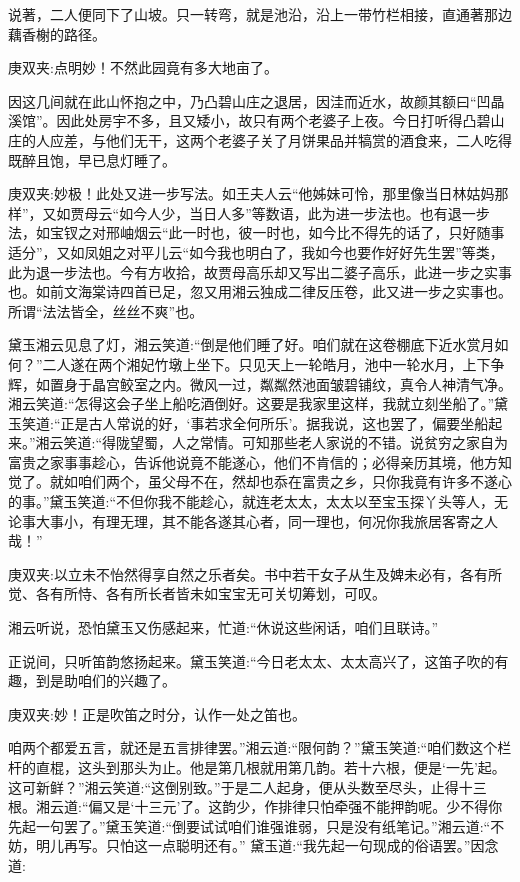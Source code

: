 \begin{parag}
    说著，二人便同下了山坡。只一转弯，就是池沿，沿上一带竹栏相接，直通著那边藕香榭的路径。\begin{note}庚双夹:点明妙！不然此园竟有多大地亩了。\end{note}因这几间就在此山怀抱之中，乃凸碧山庄之退居，因洼而近水，故颜其额曰“凹晶溪馆”。因此处房宇不多，且又矮小，故只有两个老婆子上夜。今日打听得凸碧山庄的人应差，与他们无干，这两个老婆子关了月饼果品并犒赏的酒食来，二人吃得既醉且饱，早已息灯睡了。\begin{note}庚双夹:妙极！此处又进一步写法。如王夫人云“他姊妹可怜，那里像当日林姑妈那样”，又如贾母云“如今人少，当日人多”等数语，此为进一步法也。也有退一步法，如宝钗之对邢岫烟云“此一时也，彼一时也，如今比不得先的话了，只好随事适分”，又如凤姐之对平儿云“如今我也明白了，我如今也要作好好先生罢”等类，此为退一步法也。今有方收拾，故贾母高乐却又写出二婆子高乐，此进一步之实事也。如前文海棠诗四首已足，忽又用湘云独成二律反压卷，此又进一步之实事也。所谓“法法皆全，丝丝不爽”也。\end{note}
\end{parag}


\begin{parag}
    黛玉湘云见息了灯，湘云笑道:“倒是他们睡了好。咱们就在这卷棚底下近水赏月如何？”二人遂在两个湘妃竹墩上坐下。只见天上一轮皓月，池中一轮水月，上下争辉，如置身于晶宫鲛室之内。微风一过，粼粼然池面皱碧铺纹，真令人神清气净。湘云笑道:“怎得这会子坐上船吃酒倒好。这要是我家里这样，我就立刻坐船了。”黛玉笑道:“正是古人常说的好，‘事若求全何所乐’。据我说，这也罢了，偏要坐船起来。”湘云笑道:“得陇望蜀，人之常情。可知那些老人家说的不错。说贫穷之家自为富贵之家事事趁心，告诉他说竟不能遂心，他们不肯信的；必得亲历其境，他方知觉了。就如咱们两个，虽父母不在，然却也忝在富贵之乡，只你我竟有许多不遂心的事。”黛玉笑道:“不但你我不能趁心，就连老太太，太太以至宝玉探丫头等人，无论事大事小，有理无理，其不能各遂其心者，同一理也，何况你我旅居客寄之人哉！”\begin{note}庚双夹:以立未不怡然得享自然之乐者矣。书中若干女子从生及婢未必有，各有所觉、各有所恃、各有所长者皆未如宝宝无可关切筹划，可叹。\end{note}湘云听说，恐怕黛玉又伤感起来，忙道:“休说这些闲话，咱们且联诗。”
\end{parag}


\begin{parag}
    正说间，只听笛韵悠扬起来。黛玉笑道:“今日老太太、太太高兴了，这笛子吹的有趣，到是助咱们的兴趣了。\begin{note}庚双夹:妙！正是吹笛之时分，认作一处之笛也。\end{note}咱两个都爱五言，就还是五言排律罢。”湘云道:“限何韵？”黛玉笑道:“咱们数这个栏杆的直棍，这头到那头为止。他是第几根就用第几韵。若十六根，便是‘一先’起。这可新鲜？”湘云笑道:“这倒别致。”于是二人起身，便从头数至尽头，止得十三根。湘云道:“偏又是‘十三元’了。这韵少，作排律只怕牵强不能押韵呢。少不得你先起一句罢了。”黛玉笑道:“倒要试试咱们谁强谁弱，只是没有纸笔记。”湘云道:“不妨，明儿再写。只怕这一点聪明还有。” 黛玉道:“我先起一句现成的俗语罢。”因念道:
\end{parag}


